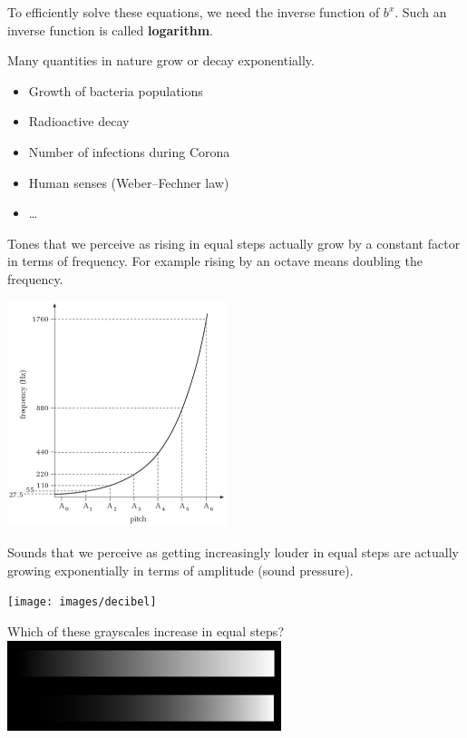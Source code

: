 To efficiently solve these equations, we need the inverse function of $b^x$.
Such an inverse function is called \textbf{logarithm}.
\begin{tcolorbox}
	Many quantities in nature grow or decay exponentially.
	\begin{itemize}
		\item Growth of bacteria populations
		\item Radioactive decay
		\item Number of infections during Corona
		\item Human senses (Weber--Fechner law)
		\item \ldots
	\end{itemize}
\end{tcolorbox}
\begin{example}
	Tones that we perceive as rising in equal steps actually grow by a constant factor in terms of frequency.
	For example rising by an octave means doubling the frequency.
	\begin{flushright}
	\includegraphics[width=0.48\textwidth]{images/octave}
	\end{flushright}
\end{example}
\begin{example}
	Sounds that we perceive as getting increasingly louder in equal steps are actually growing exponentially in terms of amplitude (sound pressure).
	\begin{flushright}
		\texttt{[image: images/decibel]}
	\end{flushright}
\end{example}
\begin{example}
	Which of these grayscales increase in equal steps?\\[10pt]
	\includegraphics[width=0.60\textwidth]{images/grayscale}
\end{example}
